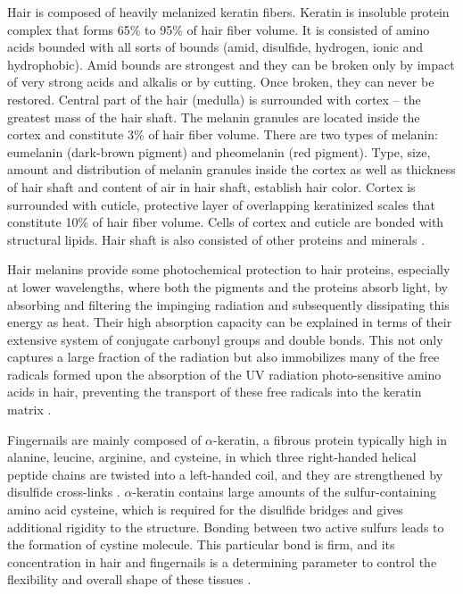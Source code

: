 \documentclass[]{interact}
\theoremstyle{plain}%
\theoremstyle{definition}
\theoremstyle{remark}
\begin{document}
Hair is composed of heavily melanized keratin fibers.
Keratin is insoluble protein complex that forms 65\% to 95\% of hair fiber volume. It is consisted of amino acids bounded with all sorts of bounds (amid, disulfide, hydrogen, ionic and hydrophobic). Amid bounds are strongest and they can be broken only by impact of very strong acids and alkalis or by cutting. Once broken, they can never be restored. Central part of the hair (medulla) is surrounded with cortex – the greatest mass of the hair shaft.
The melanin granules are located inside the cortex and constitute 3\% of hair fiber volume. There are two types of melanin: eumelanin (dark-brown pigment) and pheomelanin (red pigment). Type, size, amount and distribution of melanin granules inside the cortex as well as thickness of hair shaft and content of air in hair shaft, establish hair color. Cortex is surrounded with cuticle, protective layer of overlapping keratinized scales that constitute 10\% of hair fiber volume. Cells of cortex and
cuticle are bonded with structural lipids. Hair shaft is also consisted of other proteins and minerals \cite{sebetic2008}. 


Hair melanins provide some photochemical protection to hair proteins, especially at lower wavelengths, where both the pigments and the proteins absorb light, by absorbing and filtering the impinging radiation and subsequently dissipating this energy as heat. Their high absorption capacity can be explained in terms of their extensive system of conjugate carbonyl groups and double bonds. This not only captures a large fraction of the radiation but also immobilizes many of the free radicals formed upon the absorption of the UV radiation
photo-sensitive amino acids in hair, preventing the transport of these free radicals into the keratin matrix \cite{SantosNogueira2004}.




Fingernails are mainly composed of \(\alpha\)-keratin, a fibrous protein typically high in alanine, leucine, arginine, and cysteine, in which three right-handed helical peptide chains are twisted into a left-handed coil, and they are strengthened by disulfide cross-links \cite{CoiledCoils}. \(\alpha\)-keratin contains large amounts of the sulfur-containing amino acid cysteine, which is required for the disulfide bridges and gives additional rigidity to the structure. Bonding between two active sulfurs leads to the formation of cystine molecule.  This particular bond is firm, and its concentration in hair and fingernails is a determining parameter to control the flexibility and overall shape of these tissues \cite{KeratinStructure, marciniak2016epr}.
\end{document}
